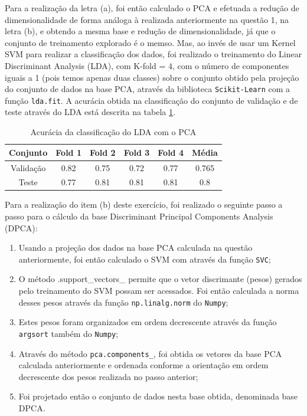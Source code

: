 \documentclass[]{abntex2}
\begin{document}
Para a realização da letra (a), foi então calculado o PCA e efetuada a redução de dimensionalidade de forma análoga à realizada anteriormente na questão 1, na letra (b), e obtendo a mesma base e redução de dimensionalidade, já que o conjunto de treinamento explorado é o memso. Mas, ao invés de usar um Kernel SVM para realizar a classificação dos dados, foi realizado o treinamento do Linear Discriminant Analysis (LDA), com K-fold = 4, com o número de componentes iguais a 1 (pois temos apenas duas classes) sobre o conjunto obtido pela projeção do conjunto de dados na base PCA, através da biblioteca \texttt{Scikit-Learn} com a função \texttt{lda.fit}. A acurácia obtida na classificação do conjunto de validação e de teste através do LDA está descrita na tabela \ref{tab:lda_clas}.

\begin{table}[H]
    \centering
    \begin{tabular}{|c|c|c|c|c|c|}
    \hline
    \rowcolor[HTML]{C0C0C0} 
    Conjunto                          & Fold 1 & Fold 2 & Fold 3 & Fold 4 & Média  \\ \hline
    \cellcolor[HTML]{C0C0C0}Validação & 0.82   & 0.75  & 0.72   & 0.77   & 0.765  \\ \hline
    \cellcolor[HTML]{C0C0C0}Teste     & 0.77   & 0.81   & 0.81   & 0.81   & 0.8 \\ \hline
    \end{tabular}
    \caption{Acurácia da classificação do LDA com o PCA}
    \label{tab:lda_clas}
\end{table}

Para a realização do item (b) deste exercício, foi realizado o seguinte passo a passo para o cálculo da base Discriminant Principal Components Analysis (DPCA):

\begin{enumerate}
    \item Usando a projeção dos dados na base PCA calculada na questão anteriormente, foi então calculado o SVM com através da função \texttt{SVC};
    \item O método {.support\_vectors\_} permite que o vetor discrimante (pesos) gerados pelo treinamento do SVM possam ser acessados. Foi então calculada a norma desses pesos através da função \texttt{np.linalg.norm} do \texttt{Numpy};
    \item Estes pesos foram organizados em ordem decrescente através da função \texttt{argsort} também do \texttt{Numpy};
    \item Através do método \texttt{pca.components\_}, foi obtida os vetores da base PCA calculada anteriormente e ordenada conforme a orientação em ordem decrescente dos pesos realizada no passo anterior;
    \item Foi projetado então o conjunto de dados nesta base obtida, denominada base DPCA.   
\end{enumerate}
\end{document}
